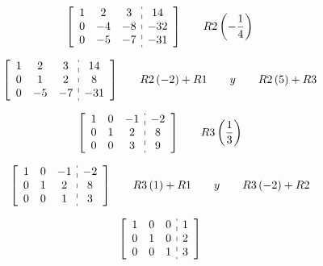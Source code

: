 \documentclass[fleqn]{article}
\begin{document}
    \begin{alignat*}{2}
      &\left[
        \begin{array}{ccc:c}
          1 & 2 & 3 & 14 \\
          0 & -4 & -8 & -32 \\
          0 & -5 & -7 & -31
        \end{array}
      \right]
      \quad
      && R2\left(-\frac{1}{4}\right)
    \end{alignat*}

    \begin{alignat*}{2}
      &\left[
        \begin{array}{ccc:c}
          1 & 2 & 3 & 14 \\
          0 & 1 & 2 & 8 \\
          0 & -5 & -7 & -31
        \end{array}
      \right]
      \quad
      && R2\left(-2\right)+R1 \qquad y \qquad R2\left(5\right)+R3
    \end{alignat*}

    \begin{alignat*}{2}
      &\left[
        \begin{array}{ccc:c}
          1 & 0 & -1 & -2 \\
          0 & 1 & 2 & 8 \\
          0 & 0 & 3 & 9
        \end{array}
      \right]
      \quad
      && R3\left(\frac{1}{3}\right)
    \end{alignat*}

    \begin{alignat*}{2}
      &\left[
        \begin{array}{ccc:c}
          1 & 0 & -1 & -2 \\
          0 & 1 & 2 & 8 \\
          0 & 0 & 1 & 3 
        \end{array}
      \right]
      \quad
      && R3\left(1\right)+R1 \qquad y \qquad R3\left(-2\right)+R2
    \end{alignat*}

    \begin{alignat*}{2}
      &\left[
        \begin{array}{ccc:c}
          1 & 0 & 0 & 1 \\
          0 & 1 & 0 & 2 \\
          0 & 0 & 1 & 3 \\
        \end{array}
      \right]
    \end{alignat*}
\end{document}
